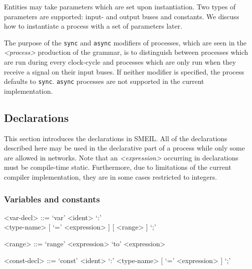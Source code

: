 


Entities may take parameters which are set upon instantiation. Two types of
parameters are supported: input- and output buses and constants. We discuss how
to instantiate a process with a set of parameters later.

The purpose of the {\tt sync} and {\tt async} modifiers of processes, which are
seen in the {\it <process>} production of the grammar, is to distinguish between
processes which are run during every clock-cycle and processes which are only
run when they receive a signal on their input buses. If neither modifier is
specified, the process defaults to {\tt sync}. {\tt async} processes are not
supported in the current implementation.


\subsection{Declarations}
This section introduces the declarations in SMEIL. All of the declarations
described here may be used in the declarative part of a {\ttfamily process}
while only some are allowed in {\ttfamily network}s. Note that an {\itshape
  <expression>} occurring in declarations must be compile-time
static. Furthermore, due to limitations of the current compiler implementation,
they are in some cases restricted to integers.

\subsubsection{Variables and constants}
\begin{grammar}
  <var-decl> ::= `var' <ident> `:' \\ <type-name> [ `=' <expression> ] [ <range> ] `;'

  <range> ::= `range' <expression> `to' <expression>

  <const-decl> ::= `const' <ident> `:' <type-name> [ `=' <expression> ] `;'
\end{grammar}

